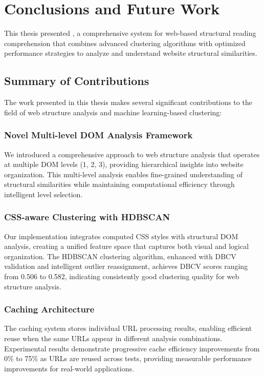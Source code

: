 \chapter{Conclusions and Future Work}
\label{chap:conclusion}

This thesis presented {\name}, a comprehensive system for web-based structural reading comprehension that combines advanced clustering algorithms with optimized performance strategies to analyze and understand website structural similarities.

\section{Summary of Contributions}
\label{sec:summary_contributions}

The work presented in this thesis makes several significant contributions to the field of web structure analysis and machine learning-based clustering:

\subsection{Novel Multi-level DOM Analysis Framework}

We introduced a comprehensive approach to web structure analysis that operates at multiple DOM levels (1, 2, 3), providing hierarchical insights into website organization. This multi-level analysis enables fine-grained understanding of structural similarities while maintaining computational efficiency through intelligent level selection.

\subsection{CSS-aware Clustering with HDBSCAN}

Our implementation integrates computed CSS styles with structural DOM analysis, creating a unified feature space that captures both visual and logical organization. The HDBSCAN clustering algorithm, enhanced with DBCV validation and intelligent outlier reassignment, achieves DBCV scores ranging from 0.506 to 0.582, indicating consistently good clustering quality for web structure analysis.

\subsection{Caching Architecture}

The caching system stores individual URL processing results, enabling efficient reuse when the same URLs appear in different analysis combinations. Experimental results demonstrate progressive cache efficiency improvements from 0\% to 75\% as URLs are reused across tests, providing measurable performance improvements for real-world applications.

